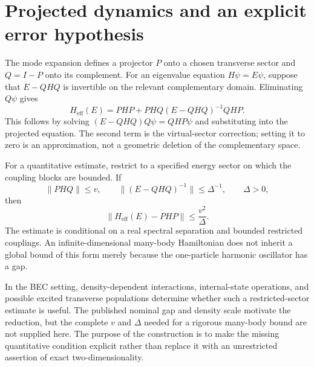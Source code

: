 \documentclass[11pt,a4paper]{article}
\theoremstyle{definition}
\theoremstyle{remark}
\begin{document}
\section{Projected dynamics and an explicit error hypothesis}
\label{app:projection}
The mode expansion defines a projector $P$ onto a chosen transverse sector and $Q=I-P$ onto its complement. For an eigenvalue equation $H\psi=E\psi$, suppose that $E-QHQ$ is invertible on the relevant complementary domain. Eliminating $Q\psi$ gives
\begin{equation}
 H_{\mathrm{eff}}(E)
 =PHP+PHQ(E-QHQ)^{-1}QHP.
 \label{eq:schur}
\end{equation}
This follows by solving $(E-QHQ)Q\psi=QHP\psi$ and substituting into the projected equation. The second term is the virtual-sector correction; setting it to zero is an approximation, not a geometric deletion of the complementary space.

For a quantitative estimate, restrict to a specified energy sector on which the coupling blocks are bounded. If
\begin{equation}
 \|PHQ\|\leq v,\qquad
 \|(E-QHQ)^{-1}\|\leq\Delta^{-1},\qquad \Delta>0,
 \label{eq:projection_assumptions}
\end{equation}
then
\begin{equation}
 \|H_{\mathrm{eff}}(E)-PHP\|\leq\frac{v^2}{\Delta}.
 \label{eq:projection_error}
\end{equation}
The estimate is conditional on a real spectral separation and bounded restricted couplings. An infinite-dimensional many-body Hamiltonian does not inherit a global bound of this form merely because the one-particle harmonic oscillator has a gap.

In the BEC setting, density-dependent interactions, internal-state operations, and possible excited transverse populations determine whether such a restricted-sector estimate is useful. The published nominal gap and density scale motivate the reduction, but the complete $v$ and $\Delta$ needed for a rigorous many-body bound are not supplied here. The purpose of the construction is to make the missing quantitative condition explicit rather than replace it with an unrestricted assertion of exact two-dimensionality.
\end{document}
